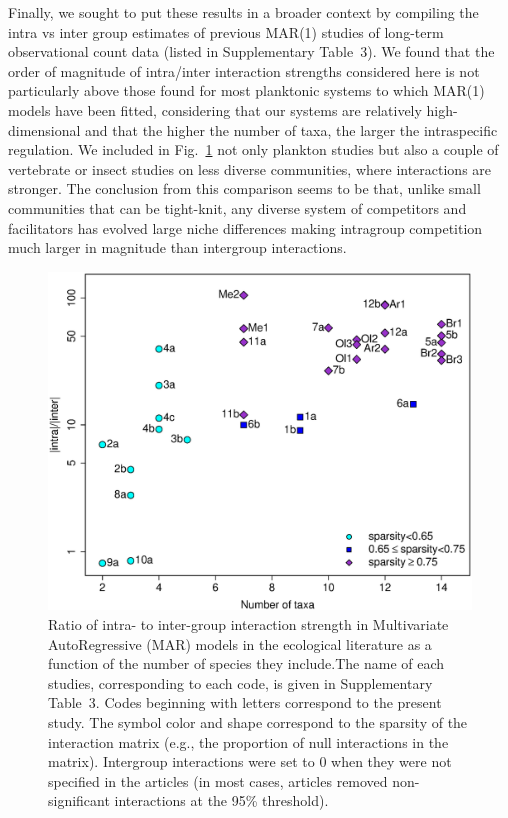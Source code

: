 \documentclass[9pt,twocolumn,twoside,lineno]{pnas-new}
\begin{document}
Finally, we sought to put these results in a broader context by compiling
the intra vs inter group estimates of previous MAR(1) studies of long-term
observational count data (listed in Supplementary Table~3). We found
that the order of magnitude of intra/inter interaction strengths considered
here is not particularly above those found for most planktonic systems
to which MAR(1) models have been fitted, considering that our systems
are relatively high-dimensional and that the higher the number of
taxa, the larger the intraspecific regulation\cite{barabas_self-regulation_2017}.
We included in Fig.~\ref{fig:meta_ratio} not only plankton studies
but also a couple of vertebrate or insect studies on less diverse
communities, where interactions are stronger. The conclusion from
this comparison seems to be that, unlike small communities that can
be tight-knit, any diverse system of competitors and facilitators
has evolved large niche differences making intragroup competition
much larger in magnitude than intergroup interactions.

\begin{figure}[!h]
\centering
\includegraphics[width=0.8\linewidth]{Ratio_function_dim}
\caption{Ratio of intra- to inter-group interaction strength in Multivariate
AutoRegressive (MAR) models in the ecological literature as a function
of the number of species they include.The name of each studies,
corresponding to each code, is given in Supplementary Table~3. Codes
beginning with letters correspond to the present study. The symbol
color and shape correspond to the sparsity of the interaction matrix
(e.g., the proportion of null interactions in the matrix). Intergroup
interactions were set to 0 when they were not specified in the articles
(in most cases, articles removed non-significant interactions at the
95\% threshold).} 
\label{fig:meta_ratio}
\end{figure}
\end{document}
